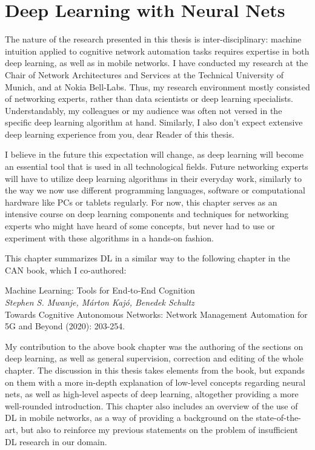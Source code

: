 \chapter{Deep Learning with Neural Nets}
	\label{cha:deep_learning}

	The nature of the research presented in this thesis is inter-disciplinary: machine intuition applied to cognitive network automation tasks requires expertise in both deep learning, as well as in mobile networks.
	I have conducted my research at the Chair of Network Architectures and Services at the Technical University of Munich, and at Nokia Bell-Labs.
	Thus, my research environment mostly consisted of networking experts, rather than data scientists or deep learning specialists.
	Understandably, my colleagues or my audience was often not versed in the specific deep learning algorithm at hand.
	Similarly, I also don't expect extensive deep learning experience from you, dear Reader of this thesis.
	
	I believe in the future this expectation will change, as deep learning will become an essential tool that is used in all technological fields.
	Future networking experts will have to utilize deep learning algorithms in their everyday work, similarly to the way we now use different programming languages, software or computational hardware like PCs or tablets regularly.
	For now, this chapter serves as an intensive course on deep learning components and techniques for networking experts who might have heard of some concepts, but never had to use or experiment with these algorithms in a hands-on fashion.
	
	This chapter summarizes \ac{DL} in a similar way to the following chapter in the \ac{CAN} book, which I co-authored:
	
	\begin{publication}
		Machine Learning: Tools for End‐to‐End Cognition \\
		\textit{Stephen S. Mwanje, Márton Kajó, Benedek Schultz} \\
		Towards Cognitive Autonomous Networks: Network Management Automation for 5G and Beyond (2020): 203-254.
	\end{publication}

	My contribution to the above book chapter was the authoring of the sections on deep learning, as well as general supervision, correction and editing of the whole chapter.
	The discussion in this thesis takes elements from the book, but expands on them with a more in-depth explanation of low-level concepts regarding neural nets, as well as high-level aspects of deep learning, altogether providing a more well-rounded introduction.
	This chapter also includes an overview of the use of \ac{DL} in mobile networks, as a way of providing a background on the state-of-the-art, but also to reinforce my previous statements on the problem of insufficient \ac{DL} research in our domain.
	
